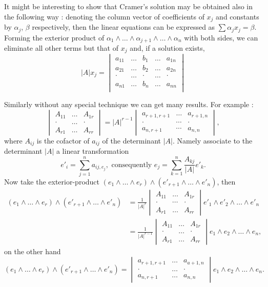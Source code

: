 It might be interesting to show that Cramer's solution may be obtained
also in the following way : denoting the column vector of coefficients
of $x_j$ and constants by $\alpha_j$, $\beta$ respectively, then the
linear equations can be expressed as $\sum \alpha_j x_j =
\beta$. Forming the exterior product of $\alpha_1 \wedge \ldots \wedge
\alpha_{j+1} \wedge \ldots \wedge \alpha_n$ with both sides, we can
eliminate all other terms but that of $x_j$ and, if a solution exists,
$$
|A| x_j = 
\begin{vmatrix}
a_{11}& \ldots &b_1 &\ldots& a_{1n}\\
a_{21}& \ldots &b_2 &\ldots& a_{2n}\\
\cdot& \ldots &\cdot & \ldots & \cdot \\
a_{n1}& \ldots &b_n &\ldots& a_{nn}\\
\end{vmatrix}
$$

Similarly without any special technique we can get many results. For
example :
$$
\begin{vmatrix}
A_{11}& \ldots& A_{1r}\\
\cdot &\ldots &\cdot \\
A_{r1} & \ldots & A_{rr}
\end{vmatrix} = |A|^{r-1} 
\begin{vmatrix}
a_{r+1, r+1}& \ldots &a_{r+1,n}\\
\cdot & \cdots & \cdot \\
a_{n,r+1} & \cdots & a_{n,n}
\end{vmatrix} ,
$$
where $A_{ij}$ is the cofactor of $a_{ij}$ of the determinant
$|A|$. Namely associate to the determinant $|A|$ a linear transformation
$$
e'_i = \sum\limits^n_{j=1} a_{ij, e_j}, \text{ consequently } e_j =
\sum\limits^n_{k=1} \frac{A_{kj}}{|A|} e'_k.  
$$\pageoriginale
Now take the exterior-product $(e_1 \wedge \ldots \wedge e_r) \wedge
(e'_{r+1} \wedge \ldots \wedge e'_n)$, then 
{\fontsize{10pt}{12pt}\selectfont
\begin{align*}
(e_1 \wedge \ldots \wedge e_r) \wedge (e'_{r+1} \wedge \ldots \wedge
  e'_n)  & =  \frac{1}{|A|^r} \begin{vmatrix}
A_{11} &\ldots &A_{1r}\\
\cdot &\cdots& \cdot\\
A_{r1} & \ldots & A_{rr}
  \end{vmatrix} e'_1 \wedge e'_2 \wedge \ldots \wedge e'_n\\
& = \frac{1}{|A|^{r-1}} \begin{vmatrix}
A_{11} & \ldots & A_{1r}\\
\cdot & \ldots & \cdot\\
A_{r1} & \ldots & A_{rr}
  \end{vmatrix} e_1 \wedge e_2 \wedge \ldots \wedge e_n ,
\end{align*}}\relax
on the other hand
$$
(e_1 \wedge \ldots \wedge e_r) \wedge (e'_{r+1} \wedge \ldots \wedge
e'_n) = \begin{vmatrix}
a_{r+1,r+1} &\ldots &a_{a+1,n}\\
\cdot& \ldots & \cdot \\
a_{n,r+1} & \ldots & a_{n,n}
\end{vmatrix} e_1 \wedge e_2 \wedge \ldots \wedge e_n.
$$

